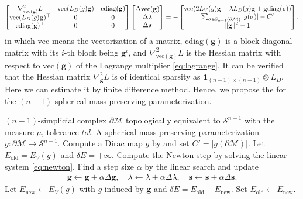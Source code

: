 \documentclass{article}
\begin{document}
\begin{align} \label{eq:newton}
\begin{bmatrix}
    \nabla_{\text{vec}(\mathbf{g})}^2 L & \text{vec}(L_D(g) \mathbf{g}) & \text{cdiag}(\mathbf{g}) \\
    \text{vec}(L_D(g) \mathbf{g})^\top & 0 & 0 \\
    \text{cdiag}(\mathbf{g})^\top & 0 & 0
\end{bmatrix}
\begin{bmatrix}
    \Delta \text{vec}(\mathbf{g}) \\ \Delta \lambda \\ \Delta \boldsymbol{s}
\end{bmatrix}
= -
\begin{bmatrix}
    \text{vec}(2L_V(g)\mathbf{g} + \lambda L_D(g) \mathbf{g} + \mathbf{g} \mathrm{diag}(\boldsymbol{s})) \\
    \sum_{\sigma\in \mathbb{S}_{n-1}(\partial \mathcal{M})} |g(\sigma)| - C'\\
    \|\mathbf{g}\|^2 - 1
\end{bmatrix},
\end{align}
in which $\text{vec}$ means the vectorization of a matrix, $\text{cdiag}(\mathbf{g})$ is a block diagonal matrix with its $i$-th block being $\mathbf{g}^{i}$, and $\nabla_{\text{vec}(\mathbf{g})}^2 L$ is the Hessian matrix with respect to ${\text{vec}(\mathbf{g})}$ of the Lagrange multiplier \eqref{eq:lagrange}.
It can be verified that the Hessian matrix $\nabla_\mathbf{g}^2 L$ is of identical sparsity as $\mathbf{1}_{(n-1)\times(n-1)}
\otimes L_D$.
Here we can estimate it by finite difference method.
Hence, we propose the  for the $(n-1)$-spherical mass-preserving parameterization.
\begin{algorithm}[h]
\caption{$(n-1)$-VSEM for the $(n-1)$-spherical mass-preserving parameterization}
\begin{algorithmic}[1] \label{alg:SMP}
    \REQUIRE $(n-1)$-simplicial complex $\partial \mathcal{M}$ topologically equivalent to $\mathcal{S}^{n-1}$ with the measure $\mu$, tolerance $tol$.
    \ENSURE A spherical mass-preserving parameterization $g: \partial \mathcal{M}\to \mathcal{S}^{n-1}$.
    \STATE Compute a Dirac map $g$ by  and set $C' = |g(\partial \mathcal{M})|$.
    \STATE Let $E_{\text{old}} = E_V(g)$ and $\delta E = +\infty$.
    \STATE Compute the Newton step by solving the linear system \eqref{eq:newton}.
    \STATE Find a step size $\alpha$ by the linear search and update
    \begin{align}
        \mathbf{g} \gets \mathbf{g} + \alpha \Delta \mathbf{g},\quad
        \lambda \gets \lambda + \alpha \Delta \lambda,\quad
        \boldsymbol{s} \gets \boldsymbol{s} + \alpha \Delta \boldsymbol{s}.
    \end{align}
    \STATE Let $E_{\text{new}} \gets E_V(g)$ with $g$ induced by $\mathbf{g}$ and $\delta E = E_{\text{old}} - E_{\text{new}}$. Set $E_{\text{old}} \gets E_{\text{new}}$.
    \ENDWHILE
\end{algorithmic}
\end{algorithm}
\end{document}
